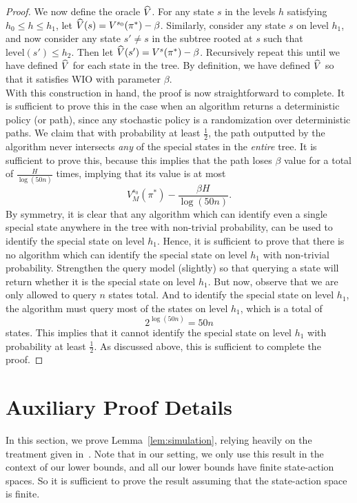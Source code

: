 \documentclass[11pt,twoside]{article}
\begin{document}
\begin{proof}
\noindent We now define the oracle $\widehat{V}$. For any state $s$ in the levels $h$ satisfying $h_0 \leq h \leq h_1$, let $\widehat{V}(s) = V^{s_0}(\pi^*) - \beta$. Similarly, consider any state $s$ on level $h_1$, and now consider any state $s' \neq s$ in the subtree rooted at $s$ such that $\text{level}(s') \leq h_2$. Then let $\widehat{V}(s') = V^{s}(\pi^*) - \beta$. Recursively repeat this until we have defined $\widehat{V}$ for each state in the tree. By definition, we have defined $\widehat{V}$ so that it satisfies WIO with parameter $\beta$. \\

\noindent With this construction in hand, the proof is now straightforward to complete. It is sufficient to prove this in the case when an algorithm returns a deterministic policy (or path), since any stochastic policy is a randomization over deterministic paths. We claim that with probability at least $\frac{1}{2}$, the path outputted by the algorithm never intersects \textit{any} of the special states in the \textit{entire} tree. It is sufficient to prove this, because this implies that the path loses $\beta$ value for a total of $\frac{H}{\log(50n)}$ times, implying that its value is at most
$$
V^{s_0}_M(\pi^*) - \frac{\beta H}{\log(50n)}.
$$
By symmetry, it is clear that any algorithm which can identify even a single special state anywhere in the tree with non-trivial probability, can be used to identify the special state on level $h_1$. Hence, it is sufficient to prove that there is no algorithm which can identify the special state on level $h_1$ with non-trivial probability. Strengthen the query model (slightly) so that querying a state will return whether it is the special state on level $h_1$. But now, observe that we are only allowed to query $n$ states total. And to identify the special state on level $h_1$, the algorithm must query most of the states on level $h_1$, which is a total of
$$
2^{\log(50n)} = 50n
$$
states. This implies that it cannot identify the special state on level $h_1$ with probability at least $\frac{1}{2}$. As discussed above, this is sufficient to complete the proof.
\end{proof}




\section{Auxiliary Proof Details}
\label{app:aux_proof}
In this section, we prove Lemma~\ref{lem:simulation}, relying heavily on the treatment given in~\citep{kakade03}. Note that in our setting, we only use this result in the context of our lower bounds, and all our lower bounds have finite state-action spaces. So it is sufficient to prove the result assuming that the state-action space is finite.
\end{document}
